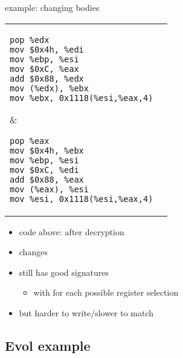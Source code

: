 \begin{frame}[fragile,label=regSwap]{example: changing bodies}
\lstset{language=myasm,style=smaller}
\begin{tabular}{ll}
\begin{lstlisting}
pop %edx
mov $0x4h, %edi
mov %ebp, %esi
mov $0xC, %eax
add $0x88, %edx
mov (%edx), %ebx
mov %ebx, 0x1118(%esi,%eax,4)
\end{lstlisting}
&
\begin{lstlisting}
pop %eax
mov $0x4h, %ebx
mov %ebp, %esi
mov $0xC, %edi
add $0x88, %eax
mov (%eax), %esi
mov %esi, 0x1118(%esi,%eax,4)
\end{lstlisting}
\end{tabular}
\begin{itemize}
\item code above: after decryption
\item {} changes
\item still has good signatures
    \begin{itemize}
    \item with  for each possible register selection
    \end{itemize}
\item but harder to write/slower to match
\end{itemize}
\end{frame}

\subsection{Evol example}

